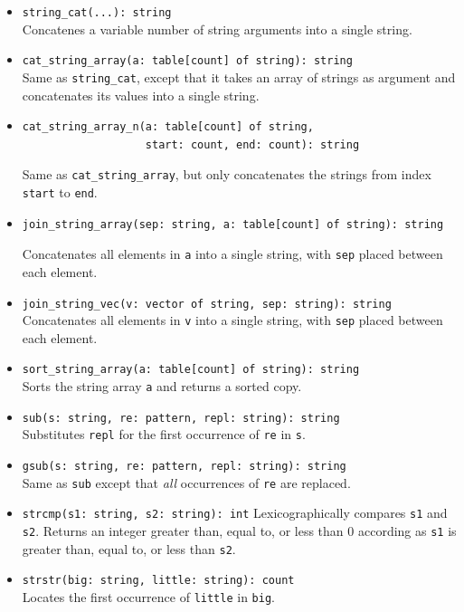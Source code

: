 \documentclass[10pt,landscape]{article}
\begin{document}
\begin{multicols*}{2}
\begin{itemize}
  \item \verb|string_cat(...): string|\\
    Concatenes a variable number of string arguments into a single string.
  \item \verb|cat_string_array(a: table[count] of string): string|\\
    Same as \verb|string_cat|, except that it takes an array of strings as
    argument and concatenates its values into a single string.
  \item
\begin{verbatim}
cat_string_array_n(a: table[count] of string,
                   start: count, end: count): string
\end{verbatim}
    Same as \verb|cat_string_array|, but only concatenates the strings from
    index \verb|start| to \verb|end|.
  \item
\begin{verbatim}
join_string_array(sep: string, a: table[count] of string): string
\end{verbatim}
    Concatenates all elements in \verb|a| into a single string,
    with \verb|sep| placed between each element.
  \item \verb|join_string_vec(v: vector of string, sep: string): string|\\
    Concatenates all elements in \verb|v| into a single string,
    with \verb|sep| placed between each element.
  \item \verb|sort_string_array(a: table[count] of string): string|\\
    Sorts the string array \verb|a| and returns a sorted copy.
  \item \verb|sub(s: string, re: pattern, repl: string): string|\\
    Substitutes \texttt{repl} for the first occurrence of \texttt{re} in
    \texttt{s}.
  \item \verb|gsub(s: string, re: pattern, repl: string): string|\\
    Same as \texttt{sub} except that \emph{all} occurrences of \texttt{re} are
    replaced.
  \item \verb|strcmp(s1: string, s2: string): int|
    Lexicographically compares \texttt{s1} and \texttt{s2}. Returns an integer
    greater than, equal to, or less than 0 according as \texttt{s1} is greater
    than, equal to, or less than \texttt{s2}.
  \item \verb|strstr(big: string, little: string): count|\\
    Locates the first occurrence of \texttt{little} in \texttt{big}.

\end{itemize}
\end{multicols*}
\end{document}

